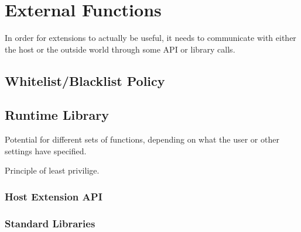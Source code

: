 \chapter {External Functions}

In order for extensions to actually be useful, it needs to communicate with
either the host or the outside world through some API or library calls.

\section {Whitelist/Blacklist Policy}

\section {Runtime Library}

Potential for different sets of functions, depending on what the user or other
settings have specified.

Principle of least privilige.

\subsection {Host Extension API}

\subsection {Standard Libraries}

